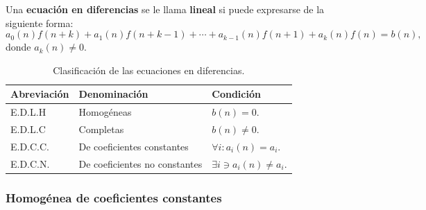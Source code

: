 \begin{frame}

\begin{definition}
	Una \textbf{ecuación en diferencias} se le llama \textbf{lineal} si puede expresarse de la siguiente forma:
	\begin{equation}\label{eq:edl}
		a_{0}(n)f\left(n+k\right)+a_{1}(n)f\left(n+k-1\right)+\cdots+a_{k-1}(n)f\left(n+1\right)+a_{k}(n)f\left(n\right)=b\left(n\right), 
	\end{equation}
	donde $a_{k}(n)\neq0$.
\end{definition}

\begin{table}
	\caption{Clasificación de las ecuaciones en diferencias.}
	\small
	\begin{tabular}{lll}
		\toprule
		Abreviación									& Denominación									& Condición\\
		\midrule
		\rowcolor{green!40} E.D.L.H	& Homogéneas										& $b(n)=0$.\\
		E.D.L.C											& Completas											& $b(n)\neq0$.\\
		E.D.C.C.										& De coeficientes constantes		& $\forall i: a_{i}(n)=a_{i}$.\\
		E.D.C.N.										& De coeficientes no constantes	& $\exists i\ni a_{i}(n)\neq a_{i}$.\\
		\bottomrule
	\end{tabular}
\end{table}

\end{frame}

\subsubsection{Homogénea de coeficientes constantes}

